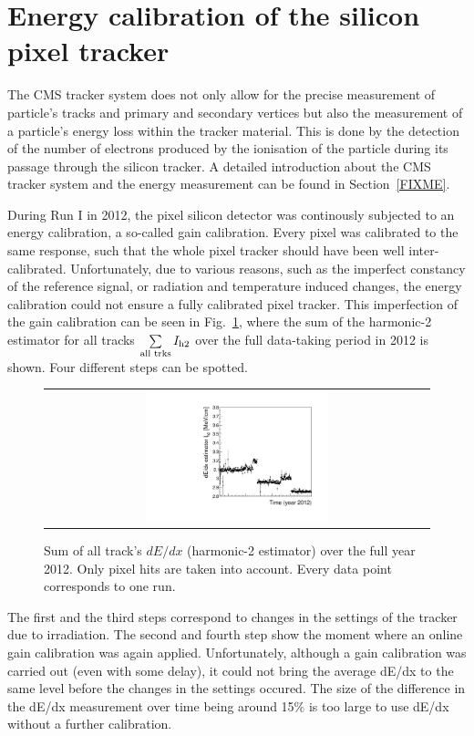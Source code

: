 \section{Energy calibration of the silicon pixel tracker}
The CMS tracker system does not only allow for the precise measurement of particle's tracks and primary and secondary vertices but also the measurement of a particle's energy loss within the tracker material.
This is done by the detection of the number of electrons produced by the ionisation of the particle during its passage through the silicon tracker.
A detailed introduction about the CMS tracker system and the energy measurement can be found in Section~\ref{FIXME}.

During Run I in 2012, the pixel silicon detector was continously subjected to an energy calibration, a so-called gain calibration.
Every pixel was calibrated to the same response, such that the whole pixel tracker should have been well inter-calibrated.
Unfortunately, due to various reasons, such as the imperfect constancy of the reference signal, or radiation and temperature induced changes, the energy calibration could not ensure a fully calibrated pixel tracker.
This imperfection of the gain calibration can be seen in Fig.~\ref{fig:StabilityPlot_beforeCalibration}, where the sum of the harmonic-2 estimator for all tracks $\sum\limits_{\text{all trks}}I_{\text{h2}}$ over the full data-taking period in 2012 is shown.
Four different steps can be spotted.
\begin{figure}[!b]
  \centering 
  \begin{tabular}{c}
  \includegraphics[width=0.49\textwidth]{figures/analysis/StabilityPlot_Pixel_beforeCalibration_withoutStepFits_NEW.pdf}
  \end{tabular}
  \caption{Sum of all track's $dE/dx$ (harmonic-2 estimator) over the full year 2012. Only pixel hits are taken into account. Every data point corresponds to one run.} 
  \label{fig:StabilityPlot_beforeCalibration}
\end{figure}
The first and the third steps correspond to changes in the settings of the tracker due to irradiation.
The second and fourth step show the moment where an online gain calibration was again applied.
Unfortunately, although a gain calibration was carried out (even with some delay), it could not bring the average dE/dx to the same level before the changes in the settings occured.
The size of the difference in the dE/dx measurement over time being around 15\% is too large to use dE/dx without a further calibration.

